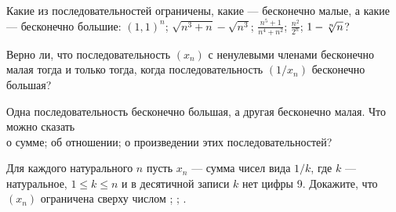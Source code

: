 \documentclass[a4paper,11pt]{article}
\begin{document}
 Какие из %
последовательностей ограничены, какие
--- бесконечно малые, а какие --- бесконечно большие:
 $(1,1)^n$;
 $\sqrt{n^3+n} - \sqrt{n^3}$;
 $\frac{n^5+1}{n^4+n^2}$;
$\frac{n^2}{2^n}$;
 $1-\root n \of n$?



 Верно ли, что последовательность $(x_n)$ с ненулевыми
членами %
бесконечно малая тогда и только тогда, когда
последовательность $(1/x_n)$ %
бесконечно большая?


Одна последовательность бесконечно большая,
а другая бесконечно малая.
Что можно сказать\\
 о сумме;
 об отношении;
 о произведении этих последовательностей?

Для каждого натурального $n$ пусть $x_n$ --- сумма чисел вида $1/k$,
где $k$ --- натуральное,
$1\leq k\leq n$ и в десятичной записи $k$
нет цифры 9. Докажите, что $(x_n)$ ограничена сверху числом
;
;
.
%


\end{document}
